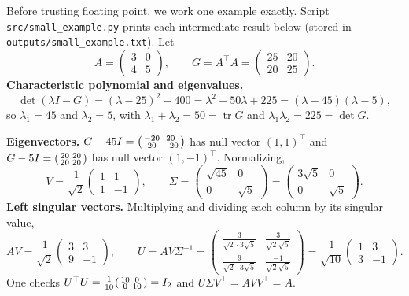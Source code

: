 \documentclass[11pt,letterpaper]{article}
\numberwithin{equation}{section}
\newcommand{\tr}{\operatorname{tr}}
\newcommand{\fn}[1]{\texttt{#1}}
\begin{document}
Before trusting floating point, we work one example exactly. Script \fn{src/small\_example.py} prints each intermediate result below (stored in \fn{outputs/small\_example.txt}). Let
\begin{equation}\label{eq:smallA}
A=\begin{pmatrix}3&0\\4&5\end{pmatrix},\qquad
G=A^\top A=\begin{pmatrix}25&20\\20&25\end{pmatrix}.
\end{equation}
\textbf{Characteristic polynomial and eigenvalues.}
\begin{equation}\label{eq:charpoly}
\det(\lambda I-G)=(\lambda-25)^2-400=\lambda^2-50\lambda+225=(\lambda-45)(\lambda-5),
\end{equation}
so $\lambda_1=45$ and $\lambda_2=5$, with $\lambda_1+\lambda_2=50=\tr G$ and $\lambda_1\lambda_2=225=\det G$.

\textbf{Eigenvectors.} $G-45I=\begin{psmallmatrix}-20&20\\20&-20\end{psmallmatrix}$ has null vector $(1,1)^\top$ and $G-5I=\begin{psmallmatrix}20&20\\20&20\end{psmallmatrix}$ has null vector $(1,-1)^\top$. Normalizing,
\begin{equation}\label{eq:smallV}
V=\frac{1}{\sqrt2}\begin{pmatrix}1&1\\1&-1\end{pmatrix},\qquad
\Sigma=\begin{pmatrix}\sqrt{45}&0\\0&\sqrt5\end{pmatrix}=\begin{pmatrix}3\sqrt5&0\\0&\sqrt5\end{pmatrix}.
\end{equation}
\textbf{Left singular vectors.} Multiplying and dividing each column by its singular value,
\begin{equation}\label{eq:smallU}
AV=\frac{1}{\sqrt2}\begin{pmatrix}3&3\\9&-1\end{pmatrix},\qquad
U=AV\Sigma^{-1}=\begin{pmatrix}\tfrac{3}{\sqrt2\cdot3\sqrt5}&\tfrac{3}{\sqrt2\sqrt5}\\[2pt]\tfrac{9}{\sqrt2\cdot3\sqrt5}&\tfrac{-1}{\sqrt2\sqrt5}\end{pmatrix}
=\frac{1}{\sqrt{10}}\begin{pmatrix}1&3\\3&-1\end{pmatrix}.
\end{equation}
One checks $U^\top U=\tfrac1{10}\begin{psmallmatrix}10&0\\0&10\end{psmallmatrix}=I_2$ and $U\Sigma V^\top=AVV^\top=A$.
\end{document}
